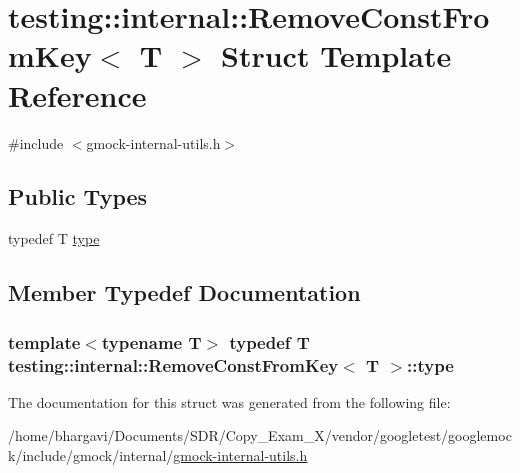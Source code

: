 \hypertarget{structtesting_1_1internal_1_1_remove_const_from_key}{}\section{testing\+:\+:internal\+:\+:Remove\+Const\+From\+Key$<$ T $>$ Struct Template Reference}
\label{structtesting_1_1internal_1_1_remove_const_from_key}


{\ttfamily \#include $<$gmock-\/internal-\/utils.\+h$>$}

\subsection*{Public Types}
\begin{DoxyCompactItemize}
\item 
typedef T \hyperlink{structtesting_1_1internal_1_1_remove_const_from_key_ab657b0a0fe4ebc499d27011f73c794c1}{type}
\end{DoxyCompactItemize}


\subsection{Member Typedef Documentation}
\subsubsection[{\texorpdfstring{type}{type}}]{\setlength{\rightskip}{0pt plus 5cm}template$<$typename T$>$ typedef T {\bf testing\+::internal\+::\+Remove\+Const\+From\+Key}$<$ T $>$\+::{\bf type}}\hypertarget{structtesting_1_1internal_1_1_remove_const_from_key_ab657b0a0fe4ebc499d27011f73c794c1}{}\label{structtesting_1_1internal_1_1_remove_const_from_key_ab657b0a0fe4ebc499d27011f73c794c1}


The documentation for this struct was generated from the following file\+:\begin{DoxyCompactItemize}
\item 
/home/bhargavi/\+Documents/\+S\+D\+R/\+Copy\+\_\+\+Exam\+\_\+X/vendor/googletest/googlemock/include/gmock/internal/\hyperlink{gmock-internal-utils_8h}{gmock-\/internal-\/utils.\+h}\end{DoxyCompactItemize}
